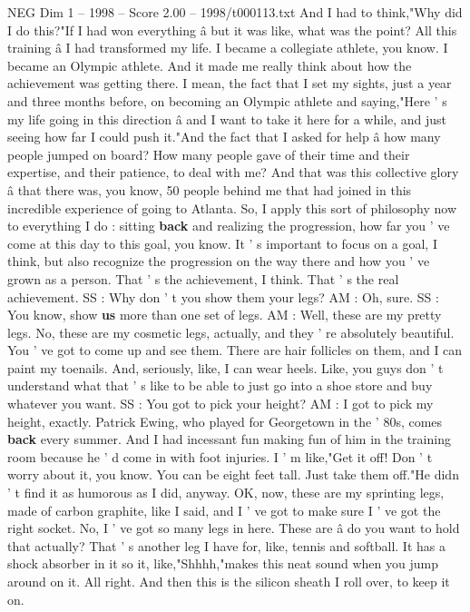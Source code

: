 \begin{textsample}{NEG Dim 1 – 1998 – Score 2.00 – 1998/t000113.txt}
And I had to think,"Why did I do this?"If I had won everything â but it was like, what was the point?
All this training â I had transformed my life.
I became a collegiate athlete, you know.
I became an Olympic athlete.
And it made me really think about how the achievement was getting there.
I mean, the fact that I set my sights, just a year and three months before, on becoming an Olympic athlete and saying,"Here ' s my life going in this direction â and I want to take it here for a while, and just seeing how far I could push it."And the fact that I asked for help â how many people jumped on board?
How many people gave of their time and their expertise, and their patience, to deal with me?
And that was this collective glory â that there was, you know, 50 people behind me that had joined in this incredible experience of going to Atlanta.
So, I apply this sort of philosophy now to everything I do : sitting \textbf{back} and realizing the progression, how far you ' ve come at this day to this goal, you know.
It ' s important to focus on a goal, I think, but also recognize the progression on the way there and how you ' ve grown as a person.
That ' s the achievement, I think.
That ' s the real achievement.
SS : Why don ' t you show them your legs?
AM : Oh, sure.
SS : You know, show \textbf{us} more than one set of legs.
AM : Well, these are my pretty legs.
No, these are my cosmetic legs, actually, and they ' re absolutely beautiful.
You ' ve got to come up and see them.
There are hair follicles on them, and I can paint my toenails.
And, seriously, like, I can wear heels.
Like, you guys don ' t understand what that ' s like to be able to just go into a shoe store and buy whatever you want.
SS : You got to pick your height?
AM : I got to pick my height, exactly.
Patrick Ewing, who played for Georgetown in the ' 80s, comes \textbf{back} every summer.
And I had incessant fun making fun of him in the training room because he ' d come in with foot injuries.
I ' m like,"Get it off!
Don ' t worry about it, you know.
You can be eight feet tall.
Just take them off."He didn ' t find it as humorous as I did, anyway.
OK, now, these are my sprinting legs, made of carbon graphite, like I said, and I ' ve got to make sure I ' ve got the right socket.
No, I ' ve got so many legs in here.
These are â do you want to hold that actually?
That ' s another leg I have for, like, tennis and softball.
It has a shock absorber in it so it, like,"Shhhh,"makes this neat sound when you jump around on it.
All right.
And then this is the silicon sheath I roll over, to keep it on.

\end{textsample}
